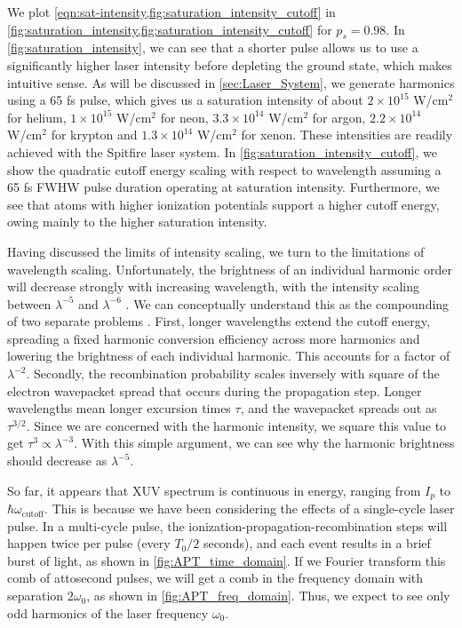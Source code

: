 We plot \cref{eqn:sat-intensity,fig:saturation_intensity_cutoff} in \cref{fig:saturation_intensity,fig:saturation_intensity_cutoff} for $p_s = 0.98$. In \cref{fig:saturation_intensity}, we can see that a shorter pulse allows us to use a significantly higher laser intensity before depleting the ground state, which makes intuitive sense. As will be discussed in \cref{sec:Laser_System}, we generate harmonics using a 65 fs pulse, which gives us a saturation intensity of about $2\times10^{15}$ W/cm$^2$ for helium, $1\times10^{15}$ W/cm$^2$ for neon, $3.3\times10^{14}$ W/cm$^2$ for argon, $2.2\times10^{14}$ W/cm$^2$ for krypton and $1.3\times10^{14}$ W/cm$^2$ for xenon. These intensities are readily achieved with the Spitfire laser system. In \cref{fig:saturation_intensity_cutoff}, we show the quadratic cutoff energy scaling with respect to wavelength assuming a 65 fs FWHW pulse duration operating at saturation intensity. Furthermore, we see that atoms with higher ionization potentials support a higher cutoff energy, owing mainly to the higher saturation intensity.

Having discussed the limits of intensity scaling, we turn to the limitations of wavelength scaling. Unfortunately, the brightness of an individual harmonic order will decrease strongly with increasing wavelength, with the intensity scaling between $\lambda^{-5}$ and $\lambda^{-6}$ \cite{tateScalingWavePacketDynamics2007,shinerWavelengthScalingHigh2009}. We can conceptually understand this as the compounding of two separate problems \cite{lewensteinTheoryHighharmonicGeneration1994}. First, longer wavelengths extend the cutoff energy, spreading a fixed harmonic conversion efficiency across more harmonics and lowering the brightness of each individual harmonic. This accounts for a factor of $\lambda^{-2}$. Secondly, the recombination probability scales inversely with square of the electron wavepacket spread that occurs during the propagation step. Longer wavelengths mean longer excursion times $\tau$, and the wavepacket spreads out as $\tau^{3/2}$. Since we are concerned with the harmonic intensity, we square this value to get $\tau^3 \propto \lambda^{-3}$. With this simple argument, we can see why the harmonic brightness should decrease as $\lambda^{-5}$.

So far, it appears that XUV spectrum is continuous in energy, ranging from $I_p$ to $\hbar \omega_{\textrm{cutoff}}$. This is because we have been considering the effects of a single-cycle laser pulse. In a multi-cycle pulse, the ionization-propagation-recombination steps will happen twice per pulse (every $T_0/2$ seconds), and each event results in a brief burst of light, as shown in \cref{fig:APT_time_domain}. If we Fourier transform this comb of attosecond pulses, we will get a comb in the frequency domain with separation $2 \omega_0$, as shown in \cref{fig:APT_freq_domain}. Thus, we expect to see only odd harmonics of the laser frequency $\omega_0$.

